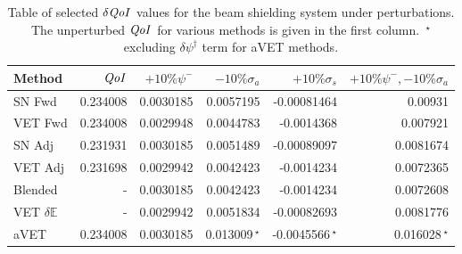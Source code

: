 \documentclass[12pt]{report}
\newcommand{\Edd}{\mathbb{E}}
\newcommand{\sigs}{\sigma_s}
\newcommand{\siga}{\sigma_a}
\newcommand{\qoi}{{\it QoI}\xspace}
\begin{document}
\begin{table}[H]
\centering
  \begin{tabular}{| l | r || r | r | r | r |}
    \hline
    Method  & $\qoi$ & $+10\% \psi^- $  & $-10\% \siga $ & $+10\% \sigs $ & $+10\% \psi^-,-10\% \siga$ \\ \hline
     SN Fwd 			&0.234008 	&0.0030185 &0.0057195 &-0.00081464 & 0.00931\\ \hline
     VET Fwd			&0.234008 	&0.0029948 &0.0044783&-0.0014368 &0.007921\\ \hline
     SN Adj  			&0.231931 	&0.0030185 &0.0051489 &-0.00089097 &0.0081674\\ \hline
     VET Adj 			&0.231698 	&0.0029942 &0.0042423 &-0.0014234 &0.0072365\\ \hline
     Blended 			&-			&0.0030185 &0.0042423 &-0.0014234 &0.0072608\\ \hline
     VET $\delta \Edd$ 	&-			&0.0029942 &0.0051834 &-0.00082693 &0.0081776\\ \hline
     aVET				&0.234008 	&0.0030185 &0.013009$\,^\star$ &-0.0045566$\,^\star$	&0.016028$\,^\star$\\ \hline
    \end{tabular}
  \caption{Table of selected $\delta \qoi$ values for the beam shielding system under perturbations. The unperturbed $\qoi$ for various methods is given in the first column. $\,^\star$excluding $\delta \psi^\dag$ term for aVET methods.}
  \label{TableT31}
\end{table}

\end{document}
